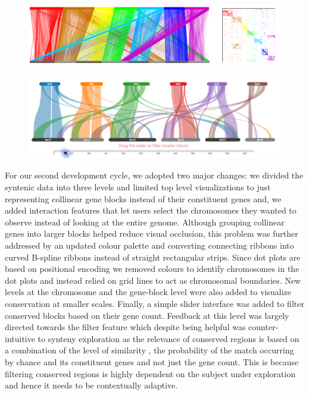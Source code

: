 \begin{figure}
  \centering
  \includegraphics[width=1\linewidth]{images/ch_4_first_iteration.PNG}
  \label{fig:ch_4_first_iteration}
\end{figure}

\begin{figure}[h]
  \centering
  \includegraphics[width=0.85\linewidth]{images/ch_4_base_viewer.PNG}
  \label{fig:ch_4_base_viewer}
\end{figure}


For our second development cycle, we adopted two major changes: we divided the syntenic data into three levels and limited top level visualizations to just representing collinear gene blocks instead of their constituent genes and, we added interaction features that let users select the chromosomes they wanted to observe instead of looking at the entire genome. Although grouping collinear genes into larger blocks helped reduce visual occlusion, this problem was further addressed by an updated colour palette and converting connecting ribbons into curved B-spline ribbons instead of straight rectangular strips. Since dot plots are based on positional encoding we removed colours to identify chromosomes in the dot plots and instead relied on grid lines to act as chromosomal boundaries. New levels at the chromosome and the gene-block level were also added to visualize conservation at smaller scales. Finally, a simple slider interface was added to filter conserved blocks based on their gene count. Feedback at this level was largely directed towards the filter feature which despite being helpful was counter-intuitive to synteny exploration as the relevance of conserved regions is based on a combination of the level of similarity , the probability of the match occurring by chance and its constituent genes and not just the gene count. This is because filtering conserved regions is highly dependent on the subject under exploration and hence it needs to be contextually adaptive.


